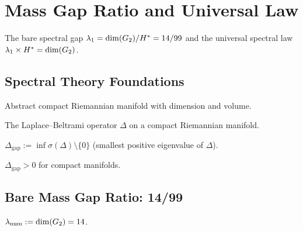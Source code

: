 \chapter{Mass Gap Ratio and Universal Law}\label{chap:mass_gap}

The bare spectral gap $\lambda_1 = \mathrm{dim}(G_2) / H^* = 14/99$
and the universal spectral law $\lambda_1 \times H^* = \mathrm{dim}(G_2)$.

\section{Spectral Theory Foundations}

\begin{definition}\label{def:compact_manifold}
    \leanok
    Abstract compact Riemannian manifold with dimension and volume.
\end{definition}

\begin{definition}\label{def:laplace_beltrami}
    \leanok
    The Laplace--Beltrami operator $\Delta$ on a compact Riemannian manifold.
\end{definition}

\begin{definition}\label{def:mass_gap}
    \leanok
    $\Delta_{\mathrm{gap}} := \inf \sigma(\Delta) \setminus \{0\}$
    (smallest positive eigenvalue of $\Delta$).
\end{definition}

\begin{theorem}\label{thm:mass_gap_pos}
    \leanok
    $\Delta_{\mathrm{gap}} > 0$ for compact manifolds.
\end{theorem}

\section{Bare Mass Gap Ratio: 14/99}

\begin{definition}\label{def:mgr_num}
    \leanok
    $\lambda_{\mathrm{num}} := \mathrm{dim}(G_2) = 14$.
\end{definition}

